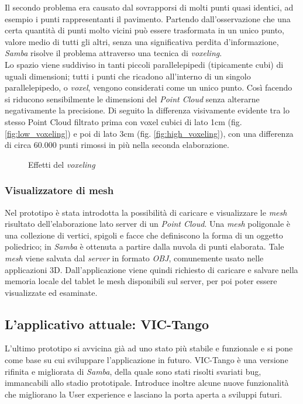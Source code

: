 \noindent
Il secondo problema era causato dal sovrapporsi di molti punti quasi identici, ad esempio i punti rappresentanti il pavimento. Partendo dall'osservazione che una certa quantità di punti molto vicini può essere trasformata in un unico punto, valore medio di tutti gli altri, senza una significativa perdita d'informazione, \emph{Samba} risolve il problema attraverso una tecnica di \emph{voxeling}.\\
Lo spazio viene suddiviso in tanti piccoli parallelepipedi (tipicamente cubi) di uguali dimensioni; tutti i punti che ricadono all'interno di un singolo parallelepipedo, o \emph{voxel}, vengono considerati come un unico punto. Così facendo si riducono sensibilmente le dimensioni del \emph{Point Cloud} senza alterarne negativamente la precisione.
Di seguito la differenza visivamente evidente tra lo stesso Point Cloud filtrato prima con voxel cubici di lato 1cm (fig. \ref{fig:low_voxeling}) e poi di lato 3cm (fig. \ref{fig:high_voxeling}), con una differenza di circa 60.000 punti rimossi in più nella seconda elaborazione.
\begin{figure}[htp] 
    \centering
    \hfill%
    \caption{Effetti del \emph{voxeling}}
\end{figure}
\newline

\subsubsection{Visualizzatore di mesh}
Nel prototipo è stata introdotta la possibilità di caricare e visualizzare le \emph{mesh} risultato dell'elaborazione lato server di un \emph{Point Cloud}.
Una \emph{mesh} poligonale è una collezione di vertici, spigoli e facce che definiscono la forma di un oggetto poliedrico; in \emph{Samba} è ottenuta a partire dalla nuvola di punti elaborata.
Tale \emph{mesh} viene salvata dal \emph{server} in formato \emph{OBJ}, comunemente usato nelle applicazioni 3D. Dall'applicazione viene quindi richiesto di caricare e salvare nella memoria locale del tablet le mesh disponibili sul server, per poi poter essere visualizzate ed esaminate.


\subsection{L'applicativo attuale: VIC-Tango}
L'ultimo prototipo si avvicina già ad uno stato più stabile e funzionale e si pone come base su cui sviluppare l'applicazione in futuro. VIC-Tango è una versione rifinita e migliorata di \emph{Samba}, della quale sono stati risolti svariati bug, immancabili allo stadio prototipale. Introduce inoltre alcune nuove funzionalità che migliorano la User experience e lasciano la porta aperta a sviluppi futuri.

